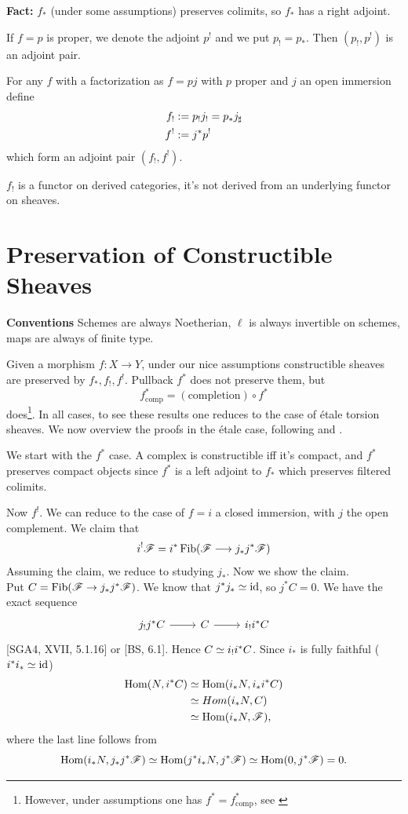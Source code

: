 \documentclass[oneside]{amsart}
\newcommand{\comp}{_{\mathrm{comp}}}	%
\begin{document}
\textbf{Fact:} $f_*$ (under some assumptions) preserves colimits, so $f_*$ has a right adjoint.

If $f=p$ is proper, we denote the adjoint $p^{!}$ and we put $p_! = p_*$. Then
$(p_!,p^{!})$ is an adjoint pair.

For any $f$ with a factorization as $f=pj$ with $p$ proper and $j$ an open immersion define
\begin{align*}
	f_! &:= p_!j_! = p_*j_\sharp \\
	f^{!} &:= j^{*}p^{!}
\end{align*}
which form an adjoint pair $(f_!,f^{!})$.
\begin{remark}
	$f_!$ is a functor on derived categories, it's not derived from an underlying functor on sheaves.
\end{remark}

\section{Preservation of Constructible Sheaves}
\textbf{Conventions} Schemes are always Noetherian, $\ell$ is always invertible on
schemes, maps are always of finite type.

Given a morphism $f:X\to Y$, under our nice assumptions constructible sheaves are
preserved by $f_*,f_!,f^{!}$. Pullback $f^{*}$ does not preserve them, but
\[
	f^{*}\comp = (\text{completion}) \circ f^{*}
\]
does\footnote{However, under assumptions one has $f^*=f^*\comp$, see \cite[6.5.10]{BS}}.
In all cases, to see these results one reduces to the case of \'etale torsion sheaves. We
now overview the proofs in the \'etale case, following \cite{SGA4.5} and \cite{Fu}.

We start with the $f^{*}$ case.
A complex is constructible iff it's compact, and $f^{*}$ preserves compact objects since
$f^{*}$ is a left adjoint to $f_*$ which preserves filtered colimits.

Now $f^{!}$. We can reduce to the case of $f=i$ a closed immersion, with $j$ the open
complement. We claim that
\[
	i^{!}\CF = i^{*} \Fib(\CF\to j_*j^{*}\CF)
\]
Assuming the claim, we reduce to studying $j_*$. Now we show the claim.\\
Put $C=\Fib(\CF\to j_*j^{*}\CF)$. We know that $j^{*}j_*\simeq \operatorname{id}$, so $j^{*}C=0$. We
have the exact sequence
\[
	\begin{tikzcd}
		j_!j^{*}C \ar[r] & C \ar[r] & i_!i^{*}C
	\end{tikzcd}
\]
[SGA4, XVII, 5.1.16] or [BS, 6.1]. Hence $C\simeq i_!i^{*}C$. Since $i_*$ is fully
faithful ($i^{*}i_*\simeq \operatorname{id}$)
\begin{align*}
	\operatorname{Hom}(N,i^{*}C) &\simeq \operatorname{Hom}(i_*N,i_*i^{*}C) \\
	&\simeq Hom(i_*N,C) \\
	&\simeq \operatorname{Hom}(i_*N,\mathscr{F}),
\end{align*}
where the last line follows from
\[
	\operatorname{Hom}(i_*N,j_*j^{*}\mathscr{F}) \simeq \operatorname{Hom}(j^{*}i_*N,j^{*}\mathscr{F}) \simeq \operatorname{Hom}(0,j^{*}\mathscr{F}) = 0.
\]
\end{document}
